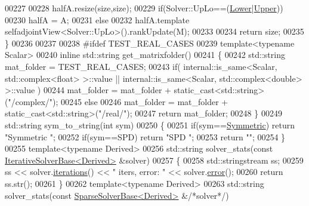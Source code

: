 \begin{DoxyCode}
00227   
00228   halfA.resize(size,size);
00229   \textcolor{keywordflow}{if}(Solver::UpLo==(\hyperlink{group__enums_gga39e3366ff5554d731e7dc8bb642f83cda891792b8ed394f7607ab16dd716f60e6}{Lower}|\hyperlink{group__enums_gga39e3366ff5554d731e7dc8bb642f83cda6bcb58be3b8b8ec84859ce0c5ac0aaec}{Upper}))
00230     halfA = A;
00231   \textcolor{keywordflow}{else}
00232     halfA.template selfadjointView<Solver::UpLo>().rankUpdate(M);
00233   
00234   \textcolor{keywordflow}{return} size;
00235 \}
00236 
00237 
00238 \textcolor{preprocessor}{#ifdef TEST\_REAL\_CASES}
00239 \textcolor{keyword}{template}<\textcolor{keyword}{typename} Scalar>
00240 \textcolor{keyword}{inline} std::string get\_matrixfolder()
00241 \{
00242   std::string mat\_folder = TEST\_REAL\_CASES; 
00243   \textcolor{keywordflow}{if}( internal::is\_same<Scalar, std::complex<float> >::value || internal::is\_same<Scalar, 
      std::complex<double> >::value )
00244     mat\_folder  = mat\_folder + \textcolor{keyword}{static\_cast<}std::string\textcolor{keyword}{>}(\textcolor{stringliteral}{"/complex/"});
00245   \textcolor{keywordflow}{else}
00246     mat\_folder = mat\_folder + \textcolor{keyword}{static\_cast<}std::string\textcolor{keyword}{>}(\textcolor{stringliteral}{"/real/"});
00247   \textcolor{keywordflow}{return} mat\_folder;
00248 \}
00249 std::string sym\_to\_string(\textcolor{keywordtype}{int} sym)
00250 \{
00251   \textcolor{keywordflow}{if}(sym==\hyperlink{group__enums_gga39e3366ff5554d731e7dc8bb642f83cda7d30fb969ef6b763c098f0015108cef4}{Symmetric}) \textcolor{keywordflow}{return} \textcolor{stringliteral}{"Symmetric "};
00252   \textcolor{keywordflow}{if}(sym==SPD)       \textcolor{keywordflow}{return} \textcolor{stringliteral}{"SPD "};
00253   \textcolor{keywordflow}{return} \textcolor{stringliteral}{""};
00254 \}
00255 \textcolor{keyword}{template}<\textcolor{keyword}{typename} Derived>
00256 std::string solver\_stats(\textcolor{keyword}{const} \hyperlink{group___iterative_linear_solvers___module_class_eigen_1_1_iterative_solver_base}{IterativeSolverBase<Derived>} &solver)
00257 \{
00258   std::stringstream ss;
00259   ss << solver.\hyperlink{group___iterative_linear_solvers___module_ae778dd098bd5e6655625b20b1e9f15da}{iterations}() << \textcolor{stringliteral}{" iters, error: "} << solver.\hyperlink{group___iterative_linear_solvers___module_a117c241af3fb1141ad0916a3cf3157ec}{error}();
00260   \textcolor{keywordflow}{return} ss.str();
00261 \}
00262 \textcolor{keyword}{template}<\textcolor{keyword}{typename} Derived>
00263 std::string solver\_stats(\textcolor{keyword}{const} \hyperlink{group___sparse_core___module_class_eigen_1_1_sparse_solver_base}{SparseSolverBase<Derived>} &\textcolor{comment}{/*solver*/})

\end{DoxyCode}
